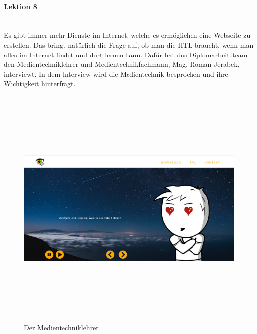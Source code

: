 \paragraph{Lektion 8} \leavevmode \\
Es gibt immer mehr Dienste im Internet, welche es ermöglichen eine Webseite zu erstellen. Das bringt natürlich die Frage auf, ob man die HTL braucht, wenn man alles im Internet findet und dort lernen kann. Dafür hat das Diplomarbeitsteam den Medientechniklehrer und Medientechnikfachmann, Mag. Roman Jerabek, interviewt. In dem Interview wird die Medientechnik besprochen und ihre Wichtigkeit hinterfragt.
\begin{figure} [h]
	\centering
\includegraphics[width=12cm,height=12cm,keepaspectratio]{webseite_abb19} 
	\caption{Der Medientechniklehrer}
\end{figure}
